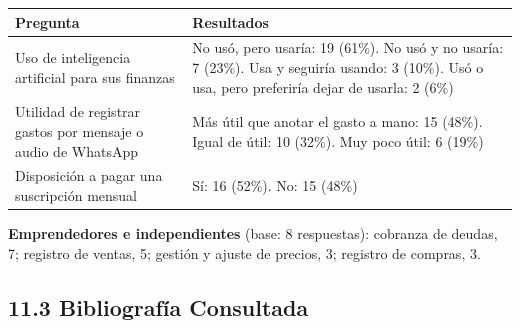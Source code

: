 {\def\LTcaptype{none} %
\begin{longtable}[]{@{}
  >{\raggedright\arraybackslash}p{}
  >{\raggedright\arraybackslash}p{}@{}}
\toprule\noalign{}
\begin{minipage}[b]{\linewidth}\raggedright
Pregunta
\end{minipage} & \begin{minipage}[b]{\linewidth}\raggedright
Resultados
\end{minipage} \\
\midrule\noalign{}
\endhead
\bottomrule\noalign{}
\endlastfoot
Uso de inteligencia artificial para sus finanzas & No usó, pero usaría:
19 (61\%). No usó y no usaría: 7 (23\%). Usa y seguiría usando: 3
(10\%). Usó o usa, pero preferiría dejar de usarla: 2 (6\%) \\
Utilidad de registrar gastos por mensaje o audio de WhatsApp & Más útil
que anotar el gasto a mano: 15 (48\%). Igual de útil: 10 (32\%). Muy
poco útil: 6 (19\%) \\
Disposición a pagar una suscripción mensual & Sí: 16 (52\%). No: 15
(48\%) \\
\end{longtable}
}

\textbf{Emprendedores e independientes} (base: 8 respuestas): cobranza
de deudas, 7; registro de ventas, 5; gestión y ajuste de precios, 3;
registro de compras, 3.

\subsection*{11.3 Bibliografía
Consultada}\label{bibliografuxeda-consultada}

